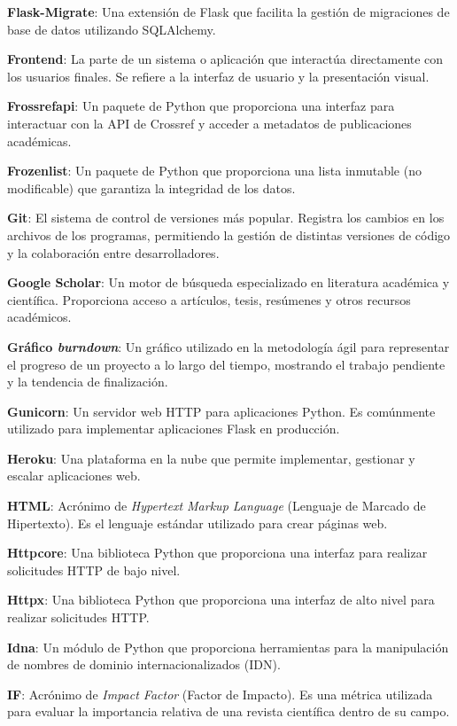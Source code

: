 \textbf{Flask-Migrate}: Una extensión de Flask que facilita la gestión de migraciones de base de datos utilizando SQLAlchemy.

\textbf{Frontend}: La parte de un sistema o aplicación que interactúa directamente con los usuarios finales. Se refiere a la interfaz de usuario y la presentación visual.

\textbf{Frossrefapi}: Un paquete de Python que proporciona una interfaz para interactuar con la API de Crossref y acceder a metadatos de publicaciones académicas.

\textbf{Frozenlist}: Un paquete de Python que proporciona una lista inmutable (no modificable) que garantiza la integridad de los datos.

\textbf{Git}: El sistema de control de versiones más popular. Registra los cambios en los archivos de los programas, permitiendo la gestión de distintas versiones de código y la colaboración entre desarrolladores.

\textbf{Google Scholar}: Un motor de búsqueda especializado en literatura académica y científica. Proporciona acceso a artículos, tesis, resúmenes y otros recursos académicos.

\textbf{Gráfico \textit{burndown}}: Un gráfico utilizado en la metodología ágil para representar el progreso de un proyecto a lo largo del tiempo, mostrando el trabajo pendiente y la tendencia de finalización.

\textbf{Gunicorn}: Un servidor web HTTP para aplicaciones Python. Es comúnmente utilizado para implementar aplicaciones Flask en producción.

\textbf{Heroku}: Una plataforma en la nube que permite implementar, gestionar y escalar aplicaciones web.

\textbf{HTML}: Acrónimo de \textit{Hypertext Markup Language} (Lenguaje de Marcado de Hipertexto). Es el lenguaje estándar utilizado para crear páginas web.

\textbf{Httpcore}: Una biblioteca Python que proporciona una interfaz para realizar solicitudes HTTP de bajo nivel.

\textbf{Httpx}: Una biblioteca Python que proporciona una interfaz de alto nivel para realizar solicitudes HTTP.

\textbf{Idna}: Un módulo de Python que proporciona herramientas para la manipulación de nombres de dominio internacionalizados (IDN).

\textbf{IF}: Acrónimo de \textit{Impact Factor} (Factor de Impacto). Es una métrica utilizada para evaluar la importancia relativa de una revista científica dentro de su campo.

